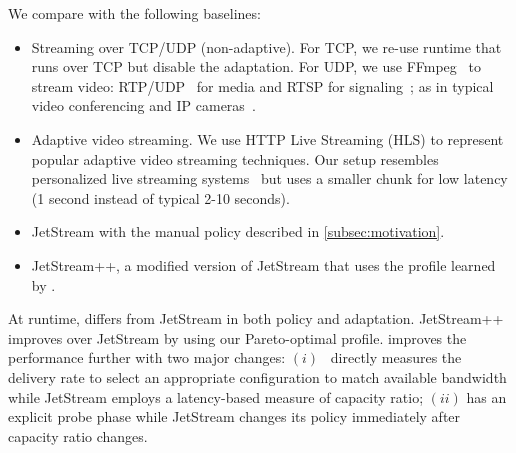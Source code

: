 We compare \sysname{} with the following baselines:

\begin{itemize}[noitemsep, nolistsep, leftmargin=*]

\item Streaming over TCP/UDP (non-adaptive). For TCP, we re-use \sysname{}
  runtime that runs over TCP but disable the adaptation. For UDP, we use
  FFmpeg~\cite{bellard2012ffmpeg} to stream video:
  RTP/UDP~\cite{schulzrinne2006rtp} for media and RTSP for
  signaling~\cite{schulzrinne1998rtsp}; as in typical video conferencing and IP
  cameras~\cite{durresi2005rtp, king2009cisco}.

\item Adaptive video streaming. We use HTTP Live Streaming (HLS) to represent
  popular adaptive video streaming techniques. Our setup resembles personalized
  live streaming systems~\cite{wang2016anatomy} but uses a smaller chunk for low
  latency (1 second instead of typical 2-10 seconds).

\item JetStream with the manual policy described in \autoref{subsec:motivation}.

\item JetStream++, a modified version of JetStream that uses the profile learned
  by \sysname{}.

\end{itemize}

At runtime, \sysname{} differs from JetStream in both policy and
adaptation. JetStream++ improves over JetStream by using our Pareto-optimal
profile. \sysname{} improves the performance further with two major changes:
$(i)$~\sysname{} directly measures the delivery rate to select an appropriate
configuration to match available bandwidth while JetStream employs a
latency-based measure of capacity ratio; $(ii)$ \sysname{} has an explicit probe
phase while JetStream changes its policy immediately after capacity ratio
changes.

